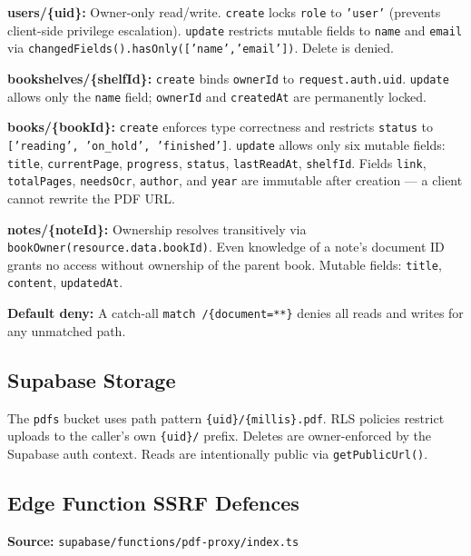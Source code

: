 \documentclass[11pt,a4paper]{article}
\begin{document}
\textbf{users/\{uid\}:} Owner-only read/write. \texttt{create} locks \texttt{role} to
\texttt{'user'} (prevents client-side privilege escalation). \texttt{update} restricts
mutable fields to \texttt{name} and \texttt{email} via
\texttt{changedFields().hasOnly(['name','email'])}. Delete is denied.

\textbf{bookshelves/\{shelfId\}:} \texttt{create} binds \texttt{ownerId} to
\texttt{request.auth.uid}. \texttt{update} allows only the \texttt{name} field;
\texttt{ownerId} and \texttt{createdAt} are permanently locked.

\textbf{books/\{bookId\}:} \texttt{create} enforces type correctness and restricts
\texttt{status} to \texttt{['reading', 'on\_hold', 'finished']}. \texttt{update} allows
only six mutable fields: \texttt{title}, \texttt{currentPage}, \texttt{progress},
\texttt{status}, \texttt{lastReadAt}, \texttt{shelfId}. Fields \texttt{link},
\texttt{totalPages}, \texttt{needsOcr}, \texttt{author}, and \texttt{year} are immutable
after creation — a client cannot rewrite the PDF URL.

\textbf{notes/\{noteId\}:} Ownership resolves transitively via
\texttt{bookOwner(resource.data.bookId)}. Even knowledge of a note's document ID
grants no access without ownership of the parent book. Mutable fields:
\texttt{title}, \texttt{content}, \texttt{updatedAt}.

\textbf{Default deny:} A catch-all \texttt{match /\{document=**\}} denies all
reads and writes for any unmatched path.

\subsection{Supabase Storage}

The \texttt{pdfs} bucket uses path pattern \texttt{\{uid\}/\{millis\}.pdf}. RLS
policies restrict uploads to the caller's own \texttt{\{uid\}/} prefix. Deletes are
owner-enforced by the Supabase auth context. Reads are intentionally public via
\texttt{getPublicUrl()}.

\subsection{Edge Function SSRF Defences}
\label{sec:ssrf}

\textbf{Source:} \texttt{supabase/functions/pdf-proxy/index.ts}
\end{document}
